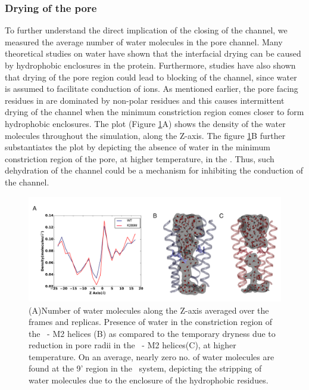 \documentclass[journal=jacsat,manuscript=article]{achemso}
\begin{document}
\subsubsection*{Drying of the pore}
To further understand the direct implication of the closing of the \MT channel, we measured the average number of water molecules in the pore channel. Many theoretical studies on water have shown that the interfacial drying can be caused by hydrophobic enclosures in the protein\cite{Zhu2010}. Furthermore, studies\cite{Zhu2012,Dong2013} have also shown that drying of the pore region could lead to blocking of the channel, since water is assumed to facilitate conduction of ions. As mentioned earlier, the pore facing residues in \GABAA are dominated by non-polar residues and this causes intermittent drying of the channel when the minimum constriction region comes closer to form hydrophobic enclosures. The plot (Figure \ref{fig:pore_water}A) shows the density of the water molecules throughout the simulation, along the Z-axis. The figure \ref{fig:pore_water}B further substantiates the plot by depicting the absence of water in the minimum constriction region of the pore, at higher temperature, in the \MTs . Thus, such dehydration of the channel could be a mechanism for inhibiting the conduction of the channel.

\begin{figure}
\begin{center}
\includegraphics[width = 1\textwidth]{figures/water_pore.pdf}
\end{center}
\caption{(A)Number of water molecules along the Z-axis averaged over the frames and replicas. Presence of water in the constriction region of the \WT\ - M2 helices (B) as compared to the temporary dryness due to reduction in pore radii in the  \MT\ - M2 helices(C), at higher temperature. On an average, nearly zero no. of water molecules are found at the 9' region in the \MT\ system, depicting the stripping of water molecules due to the enclosure of the hydrophobic residues.}
\label{fig:pore_water}
\end{figure}
\end{document}

